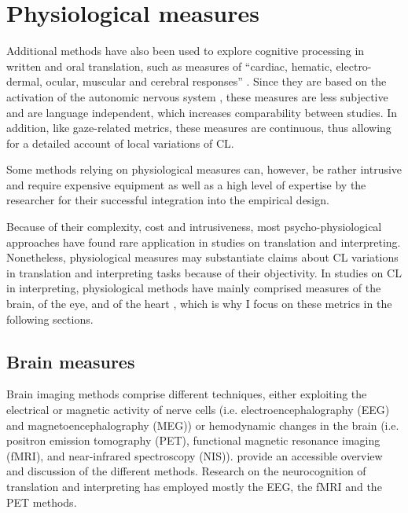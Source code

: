\section{Physiological measures} \label{neuromeasures_CL}
Additional methods have also been used to explore cognitive processing in written and oral translation, such as measures of ``cardiac, hematic, electro-dermal, ocular, muscular and cerebral responses'' \citep[25]{seeber_cognitive_2013}. Since they are based on the activation of the autonomic nervous system \citep[224]{ehrensberger-dow_cognitive_2020}, these measures are less subjective and are language independent, which increases comparability between studies. In addition, like gaze-related metrics, these measures are continuous, thus allowing for a detailed account of local variations of CL.

Some methods relying on physiological measures can, however, be rather intrusive and require expensive equipment as well as a high level of expertise by the researcher for their successful integration into the empirical design.

Because of their complexity, cost and intrusiveness, most psy\-cho-phys\-i\-o\-log\-i\-cal approaches have found rare application in studies on translation and interpreting. Nonetheless, physiological measures may substantiate claims about CL variations in translation and interpreting tasks because of their objectivity. In studies on CL in interpreting, physiological methods have mainly comprised measures of the brain, of the eye, and of the heart \citep[649]{chen_construct_2017}, which is why I focus on these metrics in the following sections.

\subsection{Brain measures} \label{brain}
\begin{sloppypar}
Brain imaging methods comprise different techniques, either exploiting the electrical or magnetic activity of nerve cells (i.e. electroencephalography (EEG) and magnetoencephalography (MEG)) or hemodynamic changes in the brain (i.e. positron emission tomography (PET), functional magnetic resonance imaging (fMRI), and near-infrared spectroscopy (NIS)). \citet{tommola_images_2000} provide an accessible overview and discussion of the different methods. Research on the neurocognition of translation and interpreting has employed mostly the EEG, the fMRI and the PET methods.  
\end{sloppypar}

